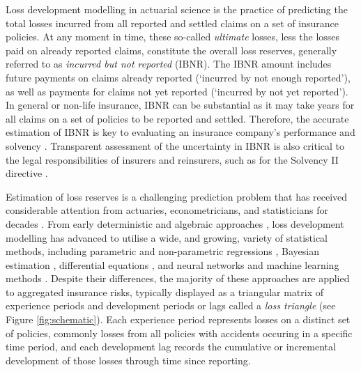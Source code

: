 Loss development modelling in actuarial science is the practice
of predicting the total losses incurred from all reported
and settled claims on a set of insurance policies. 
At any moment in time, these so-called \textit{ultimate} losses,
less the losses paid on already reported claims, 
constitute the overall loss reserves, generally referred to as
\textit{incurred but not reported} (IBNR).
The IBNR amount includes future payments on
claims already reported (`incurred by not enough reported'),
as well as payments for claims not yet reported (`incurred by not
yet reported').
In general or non-life insurance, IBNR can be substantial as it may
take years for all claims on a set of policies to be reported and settled.
Therefore, the accurate estimation of IBNR is key to evaluating an insurance company's
performance and solvency \citep{beard1960,bornhuetter1972,friedland2010,englandverrall2002,wuthrich2008}.
Transparent assessment of the uncertainty in IBNR 
is also critical to the legal responsibilities
of insurers and reinsurers, such as for the Solvency II directive
\citep{england2019,frohlich2018,munroe2018}.

Estimation of loss reserves is a challenging prediction problem
that has received considerable attention from actuaries, econometricians,
and statisticians for decades 
\citep[e.g. for some key developments, see][]{bornhuetter1972,clarke1974,
taylor1977,taylor1983,mack1993,barnett2000,englandverrall2001,englandverrall2002,
taylor2003,wuthrich2008}. From early deterministic and 
algebraic approaches \citep[e.g.][]{scurfield1968,
bornhuetter1972,clarke1974,taylor1977}, loss development modelling has
advanced to utilise a wide, and growing, variety of statistical methods, 
including parametric and non-parametric regressions \citep{mack1994,englandverrall2001,
englandverrall2002,lally2018}, Bayesian estimation \citep{englandverrall2002,dealba2002,
zhang2012,meyers2015}, differential equations \citep{gesmann2020}, and 
neural networks and machine learning methods 
\citep{kunce2017,kuo2019,almudafer2022}. Despite their differences, the majority
of these approaches are applied to aggregated
insurance risks, typically displayed as a triangular matrix of experience
periods and development periods or lags
called a \textit{loss triangle} (see Figure \ref{fig:schematic}). 
Each experience period represents losses
on a distinct set of policies, commonly losses from all 
policies with accidents occuring in a specific
time period, and each development lag 
records the cumulative or incremental
development of those losses through time since reporting.

